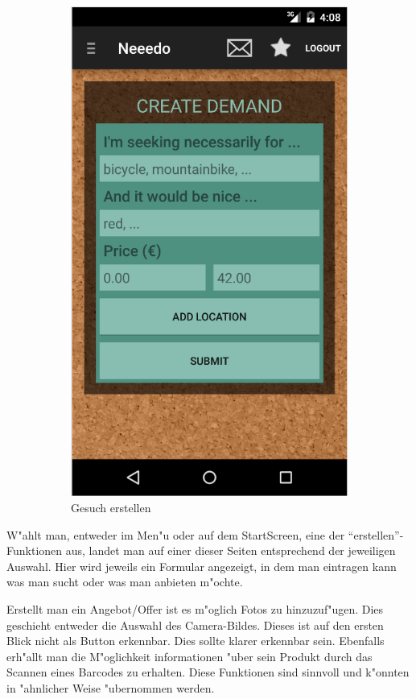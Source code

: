 \begin{figure}[H]
\begin{subfigure}{0.5\textwidth}
\includegraphics[width=0.9\linewidth]{./Bilder/createDemand.png}
\caption{Gesuch erstellen}
\label{fig:demand}
\end{subfigure}
\caption{}
\label{fig:image4}
\end{figure}

W"ahlt man, entweder im Men"u oder auf dem StartScreen, eine der \enquote{erstellen}-Funktionen aus, landet man auf einer dieser Seiten entsprechend der jeweiligen Auswahl.
Hier wird jeweils ein Formular angezeigt, in dem man eintragen kann was man sucht oder was man anbieten m"ochte. 

Erstellt man ein Angebot/Offer ist es m"oglich Fotos zu hinzuzuf"ugen.
Dies geschieht entweder die Auswahl des Camera-Bildes. 
Dieses ist auf den ersten Blick nicht als Button erkennbar. Dies sollte klarer erkennbar sein. 
Ebenfalls erh"allt man die M"oglichkeit informationen "uber sein Produkt durch das Scannen eines Barcodes zu erhalten. 
Diese Funktionen sind sinnvoll und k"onnten in "ahnlicher Weise "ubernommen werden.

